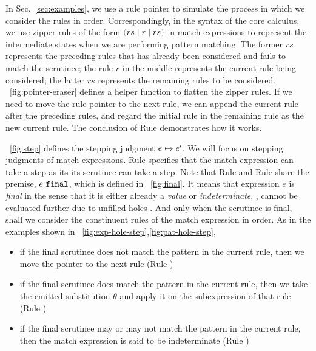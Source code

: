 \documentclass[runningheads,envcountsame,a4paper]{llncs}
\begin{document}
In Sec.~\ref{sec:examples}, we use a rule pointer to simulate the process in
which we consider the rules in order. Correspondingly, in the syntax of the core
calculus, we use zipper rules of the form $\zrulsP{rs}{r}{rs}$ in match
expressions to represent the intermediate states when we are performing pattern
matching. The former $rs$ represents the preceding rules that has already been
considered and fails to match the scrutinee; the rule $r$ in the middle
represents the current rule being considered; the latter $rs$ represents the
remaining rules to be considered. \figurename~\ref{fig:pointer-eraser} defines a
helper function to flatten the zipper rules. If we need to move the rule pointer
to the next rule, we can append the current rule after the preceding rules, and
regard the initial rule in the remaining rule as the new current rule. The
conclusion of Rule \ITFailMatch demonstrates how it works.



\figurename~\ref{fig:step} defines the stepping judgment
$e \mapsto e'$. We will focus on stepping judgments of match expressions.
Rule \ITExpMatch specifies that the match expression can take a step as its its
scrutinee can take a step. Note that Rule \ITFailMatch and Rule \ITSuccMatch
share the premise, $e ~\mathtt{final}$, which is defined in \figurename~\ref{fig:final}. It
means that expression $e$ is \textit{final} in the sense that it is either already a
\textit{value} or \textit{indeterminate}, \ie, cannot be evaluated further due to unfilled holes
\cite{DBLP:journals/pacmpl/OmarVCH19}. And only when the scrutinee is final,
shall we consider the constinuent rules of the match expression in order. As in
the examples shown in \listfigurename~\ref{fig:exp-hole-step},\ref{fig:pat-hole-step},

\begin{itemize}
  \item
    if the final scrutinee does not match the pattern in the current rule,
    then we move the pointer to the next rule (Rule \ITFailMatch)

  \item
    if the final scrutinee does match the pattern in the current rule, 
    then we take the emitted substitution $\theta$ and apply it on the subexpression of that rule (Rule \ITSuccMatch)

  \item 
    if the final scrutinee may or may not match the pattern in the current rule,
    then the match expression is said to be indeterminate (Rule \IMatch)
\end{itemize}
\end{document}
